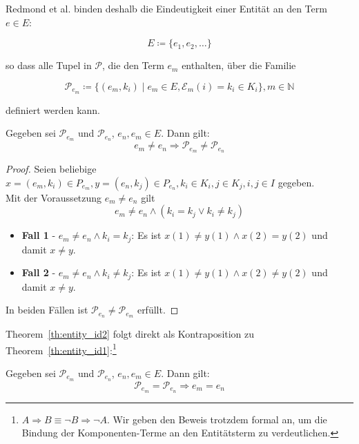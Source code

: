 \noindent
Redmond et al. binden deshalb die Eindeutigkeit einer Entität an den Term $e \in E$:

\[
    E \coloneqq \{e_1, e_2, \ldots\}
\]

\noindent
so dass alle Tupel in $\mathcal{P}$, die den Term $e_m$ enthalten, über die Familie

\[
    \mathcal{P}_{e_m} \coloneqq \{(e_m, k_i) \mid e_m \in E, \mathcal{E}_m(i) = k_i \in K_i\}, m \in \mathbb{N}
\]

\noindent
definiert werden kann.

\bigskip
\begin{theorem}\label{th:entity_id1}
    Gegeben sei $\mathcal{P}_{e_m}$ und $\mathcal{P}_{e_n}$, $e_n, e_m \in E$.
    Dann gilt:
    \[
        e_m \neq e_n \Rightarrow \mathcal{P}_{e_m} \neq \mathcal{P}_{e_n}
    \]
\end{theorem}
\bigskip

\begin{proof}
    Seien beliebige $x = (e_m, k_{i}) \in P_{e_m}, y = (e_n, k_j) \in P_{e_n}, k_i \in K_i, j \in K_j, i, j \in I$ gegeben.\\

    \noindent
    Mit der Voraussetzung $e_m \neq e_n$ gilt
    \[
        e_m \neq e_n \land (k_i = k_j \lor k_i \neq k_j)
    \]

    \begin{itemize}
        \item \textbf{Fall 1} - $e_m \neq e_n \land k_i = k_j$: Es ist $x(1) \neq y(1) \land x(2) = y(2)$ und damit $x \neq y$.
        \item \textbf{Fall 2} - $e_m \neq e_n \land k_i \neq k_j$: Es ist $x(1) \neq y(1) \land x(2) \neq y(2)$ und damit $x \neq y$.
    \end{itemize}

    \noindent
    In beiden Fällen ist  $\mathcal{P}_{e_n} \neq \mathcal{P}_{e_m}$ erfüllt.
\end{proof}
\bigskip

\noindent
Theorem~\ref{th:entity_id2} folgt direkt als Kontraposition zu Theorem~\ref{th:entity_id1}:\footnote{
    $A \Rightarrow B \equiv \neg B \Rightarrow \neg A$.
    Wir geben den Beweis trotzdem formal an, um die Bindung der Komponenten-Terme an den Entitätsterm zu verdeutlichen.
}

\begin{theorem}\label{th:entity_id2}
    Gegeben sei $\mathcal{P}_{e_m}$ und $\mathcal{P}_{e_n}$, $e_n, e_m \in E$.
    Dann gilt:
    \[
        \mathcal{P}_{e_m} = \mathcal{P}_{e_n} \Rightarrow e_m = e_n
    \]
\end{theorem}
\bigskip

